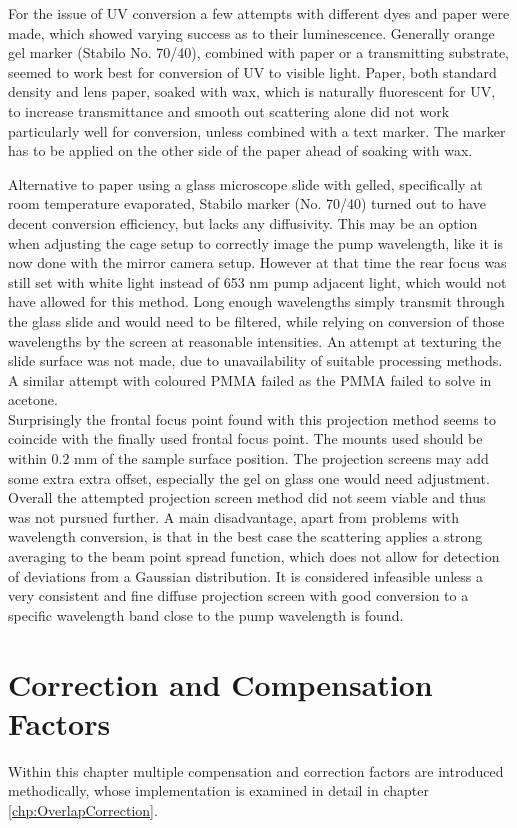 \documentclass[twoside,openright]{scrreprt}
\begin{document}
For the issue of UV conversion a few attempts with different dyes and paper were made, which showed varying success as to their luminescence.	 Generally orange gel marker (Stabilo No. 70/40), combined with paper or a transmitting substrate, seemed to work best for conversion of UV to visible light.
Paper, both standard density and lens paper, soaked with wax, which is naturally fluorescent for UV, to increase transmittance and smooth out scattering alone did not work particularly well for conversion, unless combined with a text marker. The marker has to be applied on the other side of the paper ahead of soaking with wax. 

Alternative to paper using a glass microscope slide with gelled, specifically at room temperature evaporated, Stabilo marker (No. 70/40) turned out to have decent conversion efficiency, but lacks any diffusivity.  This may be an option when adjusting the cage setup to correctly image the pump wavelength, like it is now done with the mirror camera setup. However at that time the rear focus was still set with white light instead of 653 nm pump adjacent light, which would not have allowed for this method. Long enough wavelengths simply transmit through the glass slide and would need to be filtered, while relying on conversion of those wavelengths by the screen at reasonable intensities. An attempt at texturing the slide surface was not made, due to unavailability of suitable processing methods. A similar attempt with coloured PMMA failed as the PMMA failed to solve in acetone.\\


Surprisingly the frontal focus point found with this projection method seems to coincide with the finally used frontal focus point. The mounts used should be within 0.2 mm of the sample surface position. The projection screens may add some extra extra offset, especially the gel on glass one would need adjustment.
Overall the attempted projection screen method did not seem viable and thus was not pursued further. A main disadvantage, apart from problems with wavelength conversion, is that in the best case the scattering applies a strong averaging to the beam point spread function, which does not allow for detection of deviations from a Gaussian distribution. It is considered infeasible unless a very consistent and fine diffuse projection screen with good conversion to a specific wavelength band close to the pump wavelength is found.



\chapter{Correction and Compensation Factors}\label{chap:CorrandComp}
Within this chapter multiple compensation and correction factors are introduced methodically, whose implementation is examined in detail in chapter \ref{chp:OverlapCorrection}.
\end{document}
